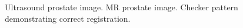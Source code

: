 \documentclass{article}[a4]
\begin{document}
\begin{figure}[tbp]
  \centering
  \hfill
  \hfill
  \hfill
  \hfill
  \caption{\protect{} Ultrasound prostate
    image. \protect{} MR prostate
    image. \protect{} Checker pattern demonstrating
    correct registration.}
  \label{fig:fig1}
\end{figure}
\end{document}
